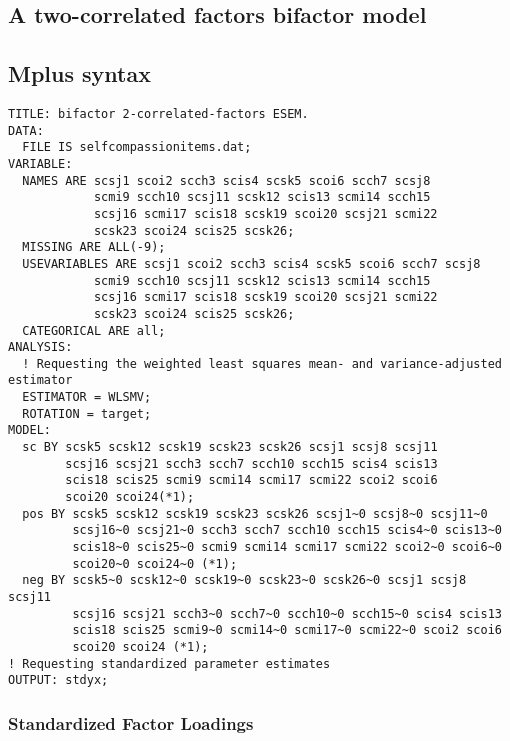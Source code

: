 \begin{appendix}


\newpage

\hypertarget{a-two-correlated-factors-bifactor-model}{%
\section{A two-correlated factors bifactor
model}\label{a-two-correlated-factors-bifactor-model}}

\hypertarget{mplus-syntax-1}{%
\subsection{Mplus syntax}\label{mplus-syntax-1}}

\begin{verbatim}
TITLE: bifactor 2-correlated-factors ESEM.
DATA:
  FILE IS selfcompassionitems.dat;
VARIABLE:
  NAMES ARE scsj1 scoi2 scch3 scis4 scsk5 scoi6 scch7 scsj8
            scmi9 scch10 scsj11 scsk12 scis13 scmi14 scch15
            scsj16 scmi17 scis18 scsk19 scoi20 scsj21 scmi22
            scsk23 scoi24 scis25 scsk26;
  MISSING ARE ALL(-9);
  USEVARIABLES ARE scsj1 scoi2 scch3 scis4 scsk5 scoi6 scch7 scsj8
            scmi9 scch10 scsj11 scsk12 scis13 scmi14 scch15
            scsj16 scmi17 scis18 scsk19 scoi20 scsj21 scmi22
            scsk23 scoi24 scis25 scsk26;
  CATEGORICAL ARE all;
ANALYSIS:
  ! Requesting the weighted least squares mean- and variance-adjusted estimator
  ESTIMATOR = WLSMV;
  ROTATION = target;
MODEL:
  sc BY scsk5 scsk12 scsk19 scsk23 scsk26 scsj1 scsj8 scsj11
        scsj16 scsj21 scch3 scch7 scch10 scch15 scis4 scis13
        scis18 scis25 scmi9 scmi14 scmi17 scmi22 scoi2 scoi6
        scoi20 scoi24(*1);
  pos BY scsk5 scsk12 scsk19 scsk23 scsk26 scsj1~0 scsj8~0 scsj11~0
         scsj16~0 scsj21~0 scch3 scch7 scch10 scch15 scis4~0 scis13~0
         scis18~0 scis25~0 scmi9 scmi14 scmi17 scmi22 scoi2~0 scoi6~0
         scoi20~0 scoi24~0 (*1);
  neg BY scsk5~0 scsk12~0 scsk19~0 scsk23~0 scsk26~0 scsj1 scsj8 scsj11
         scsj16 scsj21 scch3~0 scch7~0 scch10~0 scch15~0 scis4 scis13
         scis18 scis25 scmi9~0 scmi14~0 scmi17~0 scmi22~0 scoi2 scoi6
         scoi20 scoi24 (*1);
! Requesting standardized parameter estimates
OUTPUT: stdyx;
\end{verbatim}

\newpage

\hypertarget{standardized-factor-loadings-2}{%
\subsubsection{Standardized Factor
Loadings}\label{standardized-factor-loadings-2}}


\end{appendix}
